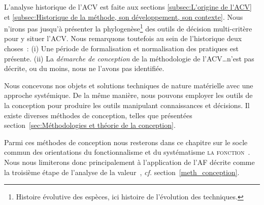 L'analyse historique de l'\gls{ACV} est faite aux sections \ref{subsec:L'origine de l'ACV} et \ref{subsec:Historique de la méthode, son développement, son contexte}.
Nous n'irons pas jusqu'à présenter la phylogenèse\footnote{Histoire évolutive des espèces, ici histoire de l'évolution des techniques.} des outils de décision multi-critère pour y situer l'\gls{ACV}.
Nous remarquons toutefois au sein de l'historique deux choses~:
(i) Une période de formalisation et normalisation des pratiques est présente.
(ii) La \emph{démarche de conception} de la méthodologie de l'\gls{ACV}\ldots n'est pas décrite, ou du moins, nous ne l'avons pas identifiée.

Nous concevons nos objets et solutions techniques de nature matérielle avec une approche systémique.%
De la même manière, nous pouvons employer les outils de la conception pour produire les outils manipulant connaissances et décisions.
Il existe diverses méthodes de conception, telles que présentées section~\ref{sec:Méthodologies et théorie de la conception}.

Parmi ces méthodes de conception
%
%
nous resterons dans ce chapitre sur le socle commun des orientations du fonctionnalisme et du systématisme \textsc{la fonction}~\cite[section 4.1. Un concept commun, le concept de fonction]{micouin_proposals_2006}.
Nous nous limiterons donc principalement à l'application de l'\acrlong{AF} décrite comme la troisième étape de l'analyse de la valeur~\cite{yannou_analyse_1998}, \textit{cf.} section~\ref{meth_conception}.

